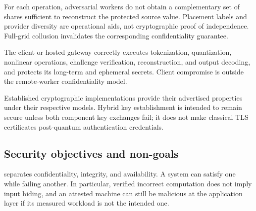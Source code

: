 \begin{assumption}\label{assumption:collusion}
For each operation, adversarial workers do not obtain a complementary set of shares sufficient to reconstruct the protected source value. Placement labels and provider diversity are operational aids, not cryptographic proof of independence. Full-grid collusion invalidates the corresponding confidentiality guarantee.
\end{assumption}

\begin{assumption}\label{assumption:client}
The client or hosted gateway correctly executes tokenization, quantization, nonlinear operations, challenge verification, reconstruction, and output decoding, and protects its long-term and ephemeral secrets. Client compromise is outside the remote-worker confidentiality model.
\end{assumption}

\begin{assumption}\label{assumption:primitives}
Established cryptographic implementations provide their advertised properties under their respective models. Hybrid key establishment is intended to remain secure unless both component key exchanges fail; it does not make classical TLS certificates post-quantum authentication credentials.
\end{assumption}

\subsection{Security objectives and non-goals}

 separates confidentiality, integrity, and availability. A system can satisfy one while failing another. In particular, verified incorrect computation does not imply input hiding, and an attested machine can still be malicious at the application layer if its measured workload is not the intended one.

